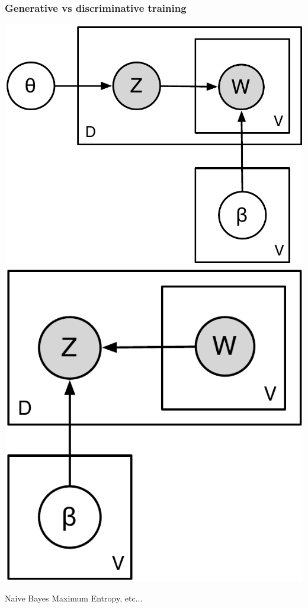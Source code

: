 \documentclass[11pt,compress,professionalfonts]{beamer}
\begin{document}
\begin{frame}[t,fragile]\frametitle{Generative vs discriminative training}

\centerline{\includegraphics[scale=.4]{pictures/unsupervised-classification} \hfill \includegraphics[scale=.4]{pictures/supervised-classification}}

Naive Bayes \hfill Maximum Entropy, etc...

\vfill

\end{frame}
\end{document}
